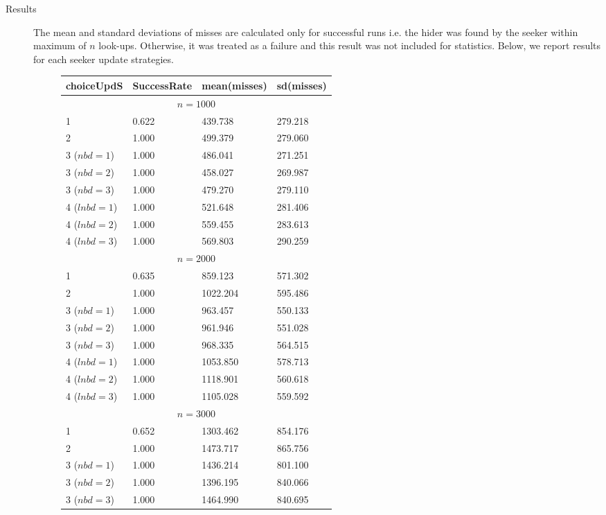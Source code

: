 \documentclass[11pt,a4paper]{article}
\begin{document}
\begin{description}
	\item[Results] The mean and standard deviations of misses are calculated only for successful runs i.e. the hider was found by the seeker within maximum of $n$ look-ups. Otherwise, it was treated as a failure and this result was not included for statistics. Below, we report results for each seeker update strategies.
	\begin{figure}[!h]
	\centering
	\begin{tabular}{llll}
		\hline \hline 
		choiceUpdS & SuccessRate & mean(misses) & sd(misses) \\
		\hline \hline 
		\multicolumn{4}{c}{$n = 1000$} \\ 
		\hline 
		1 &  0.622 & 439.738 & 279.218 \\
		2 &  1.000 & 499.379 & 279.060 \\
		3 ($nbd=1$) & 1.000 & 486.041 & 271.251 \\
		3 ($nbd=2$) & 1.000 & 458.027 & 269.987 \\
		3 ($nbd=3$) & 1.000 & 479.270 & 279.110 \\
		4 ($lnbd=1$) & 1.000 & 521.648 & 281.406 \\
		4 ($lnbd=2$) & 1.000 & 559.455 & 283.613 \\
		4 ($lnbd=3$) & 1.000 & 569.803 & 290.259 \\
		\hline 
		\hline 
		\multicolumn{4}{c}{$n = 2000$} \\ 
		\hline 
		1 &  0.635 & 859.123 & 571.302 \\
		2 &  1.000 & 1022.204 & 595.486 \\
		3 ($nbd=1$) & 1.000 & 963.457 & 550.133 \\
		3 ($nbd=2$) & 1.000 & 961.946 & 551.028 \\
		3 ($nbd=3$) & 1.000 & 968.335 & 564.515 \\
		4 ($lnbd=1$) & 1.000 & 1053.850 & 578.713 \\
		4 ($lnbd=2$) & 1.000 & 1118.901 & 560.618 \\
		4 ($lnbd=3$) & 1.000 & 1105.028 & 559.592 \\
		\hline 
		\hline 
		\multicolumn{4}{c}{$n = 3000$} \\ 
		\hline 
		1 &  0.652 & 1303.462 & 854.176 \\
		2 &  1.000 & 1473.717 & 865.756 \\
		3 ($nbd=1$) & 1.000 & 1436.214 & 801.100 \\
		3 ($nbd=2$) & 1.000 & 1396.195 & 840.066 \\
		3 ($nbd=3$) & 1.000 & 1464.990 & 840.695 \\

\end{tabular}
\end{figure}
\end{description}
\end{document}
